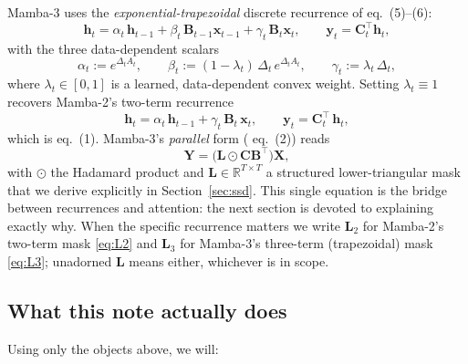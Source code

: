 \documentclass[11pt,a4paper]{article}
\begin{document}
Mamba-3 uses the \emph{exponential-trapezoidal} discrete recurrence of
\cite{mamba3} eq.~(5)–(6):
\begin{equation}\label{eq:rec3}
  \bm{h}_t = \alpha_t\,\bm{h}_{t-1}
            + \beta_t\,\bm{B}_{t-1}\bm{x}_{t-1}
            + \gamma_t\,\bm{B}_t\bm{x}_t,
  \qquad
  \bm{y}_t = \bm{C}_t^\top\bm{h}_t,
\end{equation}
with the three data-dependent scalars
\begin{equation}\label{eq:abc}
  \alpha_t := e^{\Delta_t A_t},
  \qquad
  \beta_t  := (1 - \lambda_t)\,\Delta_t\,e^{\Delta_t A_t},
  \qquad
  \gamma_t := \lambda_t\,\Delta_t,
\end{equation}
where $\lambda_t \in [0,1]$ is a learned, data-dependent convex weight.
Setting $\lambda_t \equiv 1$ recovers Mamba-2's two-term recurrence
\begin{equation}\label{eq:rec2}
  \bm{h}_t = \alpha_t\,\bm{h}_{t-1} + \gamma_t\,\bm{B}_t\,\bm{x}_t,
  \qquad
  \bm{y}_t = \bm{C}_t^\top\,\bm{h}_t,
\end{equation}
which is \cite{mamba3} eq.~(1). Mamba-3's \emph{parallel} form
(\cite{mamba3} eq.~(2)) reads
\begin{equation}\label{eq:ssd}
  \bm{Y} = \bigl(\bm{L}\odot\bm{C}\bm{B}^\top\bigr)\bm{X},
\end{equation}
with $\odot$ the Hadamard product and $\bm{L}\in\mathbb{R}^{T\times T}$
a structured lower-triangular mask that we derive explicitly in
Section~\ref{sec:ssd}. This single equation is the bridge between
recurrences and attention: the next section is devoted to explaining
exactly why. When the specific recurrence matters we write $\bm{L}_2$
for Mamba-2's two-term mask \eqref{eq:L2} and $\bm{L}_3$ for Mamba-3's
three-term (trapezoidal) mask \eqref{eq:L3}; unadorned $\bm{L}$ means
either, whichever is in scope.

\subsection{What this note actually does}

Using only the objects above, we will:
\end{document}

